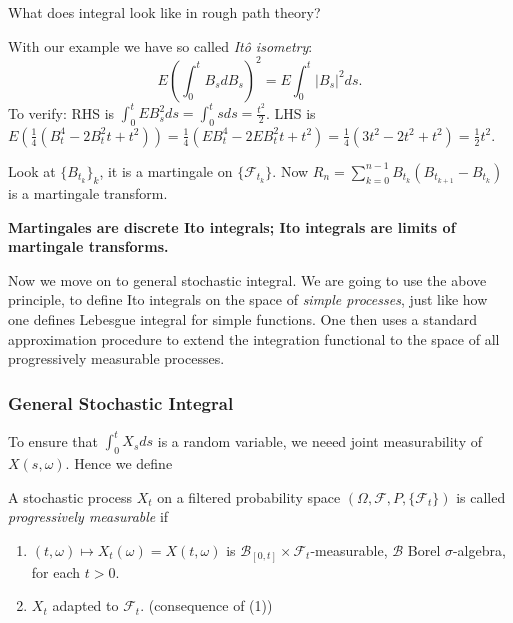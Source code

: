 \followup What does integral look like in rough path theory?



\begin{remark}
	With our example we have so called \textit{Itô isometry}:
	\[
		E\left( \int _0^t B_s d B_s \right) ^2 
		= E \int _0^t |B_s|^2 d s
	.\] 
	To verify: RHS is $\int _0^t E B_s^2 ds = \int _0^t s ds = \frac{t^2}{2}$. LHS is $E\left( \frac{1}{4} \left( B_t^4 - 2 B_t^2 t + t^2 \right)  \right) = \frac{1}{4}\left( E B_t^4 - 2 E B_t^2 t + t^2 \right) = \frac{1}{4} \left( 3 t^2 - 2 t^2 + t^2 \right) = \frac{1}{2} t^2$.
\end{remark}

\begin{remark}
	Look at $\{B_{t_k}\} _k$, it is a martingale on $\{\mathcal{F}_{t_k}\} $. Now $R_n = \sum_{k=0}^{n-1} B_{t_k} \left( B_{t_{k+1}} - B_{t_k} \right) $ is a martingale transform. 

	\textbf{Martingales are discrete Ito integrals; Ito integrals are limits of martingale transforms.}
\end{remark}

Now we move on to general stochastic integral. We are going to use the above principle, to define Ito integrals on the space of \textit{simple processes}, just like how one defines Lebesgue integral for simple functions. One then uses a standard approximation procedure to extend the integration functional to the space of all progressively measurable processes.

\subsubsection{General Stochastic Integral}


To ensure that $\int_0^t X_s ds$ is a random variable, we neeed joint measurability of $X(s, \omega)$. Hence we define
\begin{definition}
	A stochastic process $X_t$ on a filtered probability space $\left(\Omega, \mathcal{F}, P, \{\mathcal{F}_t\}\right) $ is called \textit{progressively measurable} if
	\begin{enumerate}
		\item $(t, \omega) \mapsto X_t(\omega) = X(t, \omega)$ is $\mathcal{B}_{[0,t]} \times \mathcal{F}_t$-measurable, $\mathcal{B}$ Borel $\sigma$-algebra, for each $t>0$.
		\item $X_t$ adapted to $\mathcal{F}_t$. (consequence of (1))
	\end{enumerate}
\end{definition}

